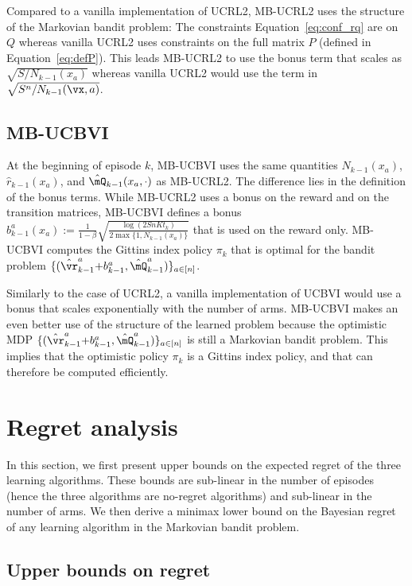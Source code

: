 Compared to a vanilla implementation of UCRL2, MB-UCRL2 uses the structure of the Markovian bandit problem: The constraints Equation~\eqref{eq:conf_rq} are on $Q$ whereas vanilla UCRL2 uses constraints on the full matrix $P$ (defined in Equation~\eqref{eq:defP}). This leads MB-UCRL2 to use the bonus term that scales as $\sqrt{S/N_{k-1}(x_a)}$ whereas vanilla UCRL2 would use the term in $\sqrt{S^n/N_{k-1}(\vx, a)}$.

\subsection{MB-UCBVI}
At the beginning of episode $k$, MB-UCBVI uses the same quantities $N_{k-1}(x_a)$, $\hat{r}_{k-1}(x_a)$, and $\hat{\mQ}_{k-1}(x_a,\cdot)$ as MB-UCRL2. The difference lies in the definition of the bonus terms. While MB-UCRL2 uses a bonus on the reward and on the transition matrices, MB-UCBVI defines a bonus $b_{k-1}^a(x_a){:=}\frac{1}{1-\beta}\sqrt{\frac{\log(2SnKt_k)}{2\max\{1,N_{k-1}(x_a)\}}}$ that is used on the reward only. MB-UCBVI computes the Gittins index policy $\pi_k$ that is optimal for the bandit problem $\{(\hat{\vr}_{k-1}^a {+}b_{k-1}^a, \hat{\mQ}_{k-1}^a)\}_{a\in[n]}$. 

Similarly to the case of UCRL2, a vanilla implementation of UCBVI would use a bonus that scales exponentially with the number of arms. MB-UCBVI makes an even  better use of the structure of the learned problem because the optimistic MDP $\{(\hat{\vr}_{k-1}^a {+}b_{k-1}^a, \hat{\mQ}_{k-1}^a)\}_{a\in[n]}$ is still a Markovian bandit problem. This implies that the optimistic policy $\pi_k$ is a Gittins index policy, and that can therefore be computed efficiently.

\section{Regret analysis}
\label{sec:analysis}

In this section, we first present upper bounds on the expected regret of the three learning algorithms.  These bounds are sub-linear in the number of episodes (hence the three algorithms are no-regret algorithms) and sub-linear in the number of arms. We then derive a minimax lower bound on the Bayesian regret of any learning algorithm in the Markovian bandit problem. 

\subsection{Upper bounds on regret}
\label{ssec:upper_bound_psrl}

